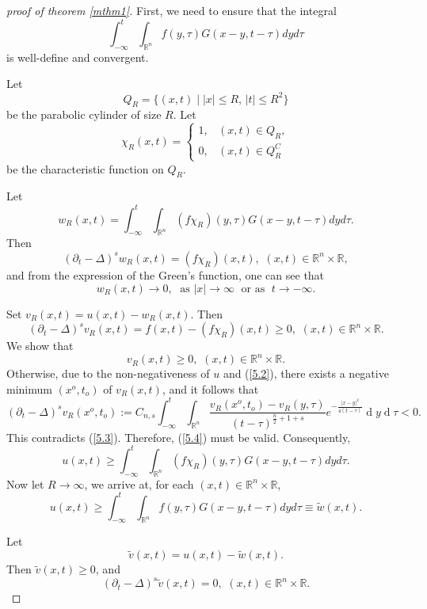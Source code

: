 \documentclass[12pt]{article}
\theoremstyle{remark}
\numberwithin{equation}{section}
\begin{document}
\begin{proof}[proof of theorem \ref{mthm1}]
First, we need to ensure that the integral
$$\int_{-\infty}^t \int_{\mathbb{R}^n} f(y,\tau) G(x-y, t-\tau) dy d\tau$$
is well-define and convergent.

Let $$Q_R = \{(x,t) \mid |x| \leq R, \, |t| \leq R^2 \}$$
be the parabolic cylinder of size $R$. Let
$$ \chi_R (x,t) = \left\{\begin{array}{ll}
1, & (x,t) \in Q_R, \\
0, & (x,t) \in Q^C_{R}
\end{array}
\right.
$$
be the characteristic function on $Q_R$.

Let $$w_R(x,t) = \int_{-\infty}^t \int_{\mathbb{R}^n} (f \chi_R) (y,\tau)  G(x-y, t-\tau) dy d\tau.$$
Then
$$ (\partial_t - \Delta)^s w_R(x,t) = (f \chi_R) (x,t), \,\, (x, t)\in \mathbb{R}^n\times \mathbb{R},$$
and from the expression of the Green's function, one can  see that
\begin{equation} \label{5.2}
w_R(x,t) \to 0, \; \mbox{ as } |x| \to \infty \; \mbox{ or as } \;  t \to - \infty.
\end{equation}


Set $v_R(x,t) = u(x,t) - w_R(x,t)$. Then
\begin{equation} \label{5.3}
 (\partial_t - \Delta)^s v_R(x,t) = f(x,t)-(f \chi_R) (x,t) \geq 0 , \,\, (x, t)\in \mathbb{R}^n\times \mathbb{R}.
 \end{equation}
We show that
\begin{equation} \label{5.4}
v_R(x,t) \geq 0, \,\, (x, t)\in \mathbb{R}^n\times \mathbb{R}.
\end{equation}
Otherwise, due to the non-negativeness of $u$ and (\ref{5.2}), there exists a negative minimum $(x^o, t_o)$ of $v_R(x,t)$, and it follows that
$$(\partial_t-\Delta)^s v_R(x^o,t_o)
:=C_{n,s}\int_{-\infty}^{t}\int_{\mathbb{R}^n}
  \frac{v_R(x^o,t_o)-v_R(y,\tau)}{(t-\tau)^{\frac{n}{2}+1+s}}e^{-\frac{|x-y|^2}{4(t-\tau)}}\operatorname{d}\!y\operatorname{d}\!\tau <0.
  $$
This contradicts (\ref{5.3}). Therefore, (\ref{5.4}) must be valid. Consequently,
$$ u(x,t) \geq \int_{-\infty}^t \int_{\mathbb{R}^n} (f \chi_R) (y,\tau)  G(x-y, t-\tau) dy d\tau.$$
Now let $R \to \infty$, we arrive at, for each $(x, t)\in \mathbb{R}^n\times \mathbb{R}$,
$$u(x,t) \geq \int_{-\infty}^t \int_{\mathbb{R}^n} f(y,\tau) G(x-y, t-\tau) dy d\tau \equiv \tilde{w}(x,t).$$

Let $$\tilde{v}(x,t) = u(x,t) - \tilde{w}(x,t).$$
Then $\tilde{v}(x,t) \geq 0$, and
$$(\partial_t-\Delta)^s \tilde{v}(x,t) = 0, \,\, (x, t)\in \mathbb{R}^n\times \mathbb{R}.$$


\end{proof}
\end{document}
